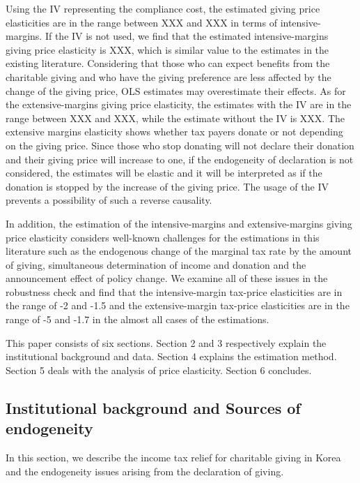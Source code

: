 \documentclass[
  11pt,
  a4paper,
]{article}
\begin{document}
Using the IV representing the compliance cost,
the estimated giving price elasticities are in the range between XXX and XXX
in terms of intensive-margins.
If the IV is not used,
we find that the estimated intensive-margins giving price elasticity is XXX,
which is similar value to the estimates in the existing literature.
Considering that those who can expect benefits from the charitable giving and
who have the giving preference are less affected by the change of the giving price,
OLS estimates may overestimate their effects.
As for the extensive-margins giving price elasticity,
the estimates with the IV are in the range between XXX and XXX,
while the estimate without the IV is XXX.
The extensive margins elasticity shows
whether tax payers donate or not depending on the giving price.
Since those who stop donating will not declare their donation and
their giving price will increase to one,
if the endogeneity of declaration is not considered,
the estimates will be elastic and it will be interpreted
as if the donation is stopped by the increase of the giving price.
The usage of the IV prevents a possibility of such a reverse causality.

In addition,
the estimation of the intensive-margins and extensive-margins giving price elasticity considers
well-known challenges for the estimations in this literature
such as the endogenous change of the marginal tax rate by the amount of giving,
simultaneous determination of income and donation and the announcement effect of policy change.
We examine all of these issues in the robustness check and
find that the intensive-margin tax-price elasticities are in the range of -2 and -1.5
and the extensive-margin tax-price elasticities are in the range of -5 and -1.7
in the almost all cases of the estimations.

This paper consists of six sections.
Section 2 and 3 respectively explain the institutional background and data.
Section 4 explains the estimation method.
Section 5 deals with the analysis of price elasticity.
Section 6 concludes.

\hypertarget{background}{%
\subsection{Institutional background and Sources of endogeneity}\label{background}}

In this section,
we describe the income tax relief for charitable giving in Korea
and the endogeneity issues arising from the declaration of giving.
\end{document}

